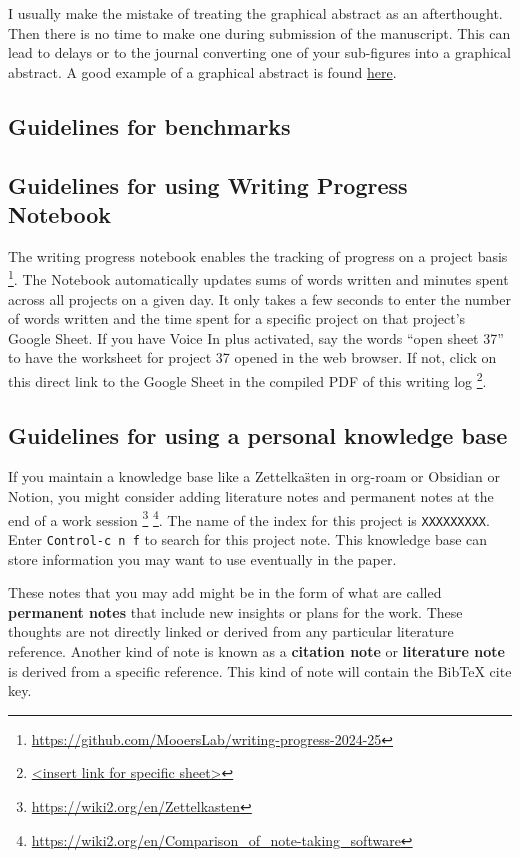 \documentclass[10pt,letterpaper]{article}
\begin{document}
I usually make the mistake of treating the graphical abstract as an afterthought.
Then there is no time to make one during submission of the manuscript.
This can lead to delays or to the journal converting one of your sub-figures into a graphical abstract.
A good example of a graphical abstract is found \href{https://www.mdpi.com/2073-4352/11/3/273}{here}.


\subsection{Guidelines for benchmarks}
\label{subsec:guides:benchmarks}


\subsection{Guidelines for using Writing Progress Notebook}
\label{subsec:guides:wpnb}

The writing progress notebook enables the tracking of progress on a project basis \footnote{\url{https://github.com/MooersLab/writing-progress-2024-25}}.
The Notebook automatically updates sums of words written and minutes spent across all projects on a given day.
It only takes a few seconds to enter the number of words written and the time spent for a specific project on that project's Google Sheet. 
If you have Voice In plus activated, say the words ``open sheet 37'' to have the worksheet for project 37 opened in the web browser.
If not, click on this direct link to the Google Sheet in the compiled PDF of this writing log \footnote{\url{<insert link for specific sheet>}}.




\subsection{Guidelines for using a personal knowledge base}
\label{subsec:guides:knowledgebase}

If you maintain a knowledge base like a Zettelka\"sten  in org-roam or Obsidian or Notion, you might consider adding literature notes and permanent notes at the end of a work session \footnote{\url{https://wiki2.org/en/Zettelkasten}} \footnote{\url{https://wiki2.org/en/Comparison_of_note-taking_software}}.
The name of the index for this project is \verb|XXXXXXXXX|.
Enter \texttt{Control-c n f} to search for this project note.
This knowledge base can store information you may want to use eventually in the paper.

These notes that you may add might be in the form of what are called \textbf{permanent notes} that include new insights or plans for the work.
These thoughts are not directly linked or derived from any particular literature reference.
Another kind of note is known as a \textbf{citation note} or \textbf{literature note} is derived from a specific reference.
This kind of note will contain the BibTeX cite key.
\end{document}
